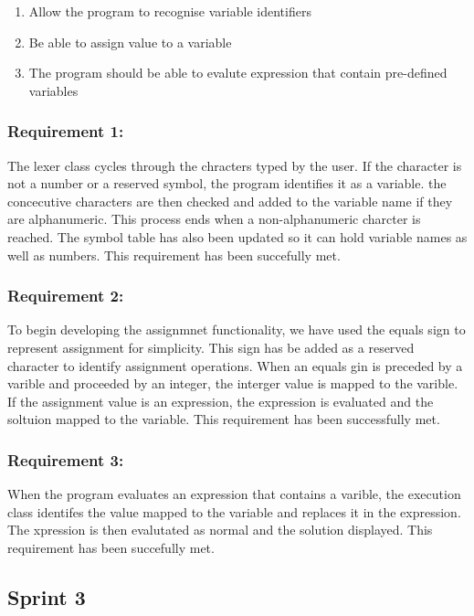 \documentclass[a4paper, oneside, 11pt]{report}
\begin{document}
\begin{enumerate}
\item Allow the program to recognise variable identifiers
\item Be able to assign value to a variable
\item The program should be able to evalute expression that contain pre-defined variables
\end{enumerate}

\subsubsection{Requirement 1: }

The lexer class cycles through the chracters typed by the user. If the character is not a number or a reserved symbol, the program identifies it as a variable. the concecutive characters are then checked and added to the variable name if they are alphanumeric. This process ends when a non-alphanumeric charcter is reached.
The symbol table has also been updated so it can hold variable names as well as numbers.
This requirement has been succefully met.

\subsubsection{Requirement 2: }

To begin developing the assignmnet functionality, we have used the equals sign to represent assignment for simplicity. This sign has be added as a reserved character to identify assignment operations. When an equals gin is preceded by a varible and proceeded by an integer, the interger value is mapped to the varible. If the assignment value is an expression, the expression is evaluated and the soltuion mapped to the variable.
This requirement has been successfully met.

\subsubsection{Requirement 3: }

When the program evaluates an expression that contains a varible, the execution class identifes the value mapped to the variable and replaces it in the expression. The xpression is then evalutated as normal and the solution displayed.
This requirement has been succefully met.

\subsection{Sprint 3}
\end{document}
